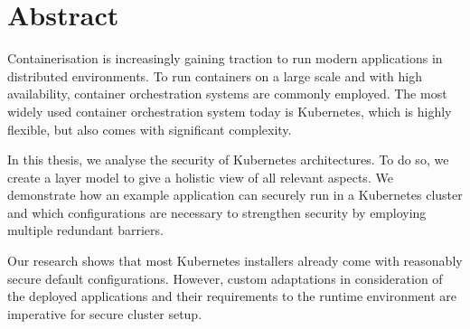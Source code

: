 

\chapter*{\centering Abstract} \label{cha:abstract}

Containerisation is increasingly gaining traction to run modern applications in distributed environments. To run containers on a large scale and with high availability, container orchestration systems are commonly employed. The most widely used container orchestration system today is Kubernetes, which is highly flexible, but also comes with significant complexity.

In this thesis, we analyse the security of Kubernetes architectures. To do so, we create a layer model to give a holistic view of all relevant aspects. We demonstrate how an example application can securely run in a Kubernetes cluster and which configurations are necessary to strengthen security by employing multiple redundant barriers.

Our research shows that most Kubernetes installers already come with reasonably secure default configurations. However, custom adaptations in consideration of the deployed applications and their requirements to the runtime environment are imperative for secure cluster setup.


